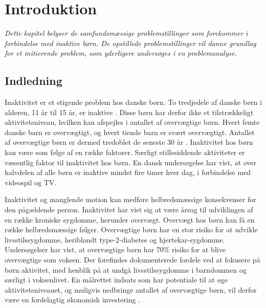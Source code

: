 \chapter{Introduktion}
\textit{Dette kapitel belyser de samfundsmæssige problemstillinger som forekommer i forbindelse med inaktive børn.
De opstillede problemstillinger vil danne grundlag for et initierende problem, som yderligere undersøges i en problemanalyse.}

\section{Indledning}
Inaktivitet er et stigende problem hos danske børn. To tredjedele af danske børn i alderen, 11 år til 15 år, er inaktive \citep{FAKTAARK_sundhedsstyrrelsen}. Disse børn har derfor ikke et tilstrækkeligt aktivitetsniveau, hvilken kan  afspejles i antallet af overvægtige børn. Hvert femte danske barn er overvægtigt, og hvert tiende barn er svært overvægtigt\citep{SKOLEBØRNSUNDERSØGELSEN}. Antallet af overvægtige børn er dermed tredoblet de seneste 30 år \citep{http://www.faktalink.dk/titelliste/overvaegtige-boern-og-unge}. \newline
Inaktivitet hos børn kan være som følge af en række faktorer. Særligt stillesiddende aktiviteter er væsentlig faktor til inaktivitet hos børn. En dansk undersøgelse har vist, at over halvdelen af alle børn er inaktive mindst fire timer hver dag, i forbindelse med videospil og TV\citep{SKOLEBØRNSUNDERSØGELSEN}.

Inaktivitet og manglende motion kan medføre helbredsmæssige konsekvenser for den pågældende person. Inaktivitet har vist sig at være årsag til udviklingen af en række kroniske sygdomme, herunder overvægt. \newline 
Overvægt hos børn kan få en række helbredsmæssige følger. Overvægtige børn har en stor risiko for at udvikle livsstilssygdomme, heriblandt type-2-diabetes og hjertekar-sygdomme. Undersøgelser har vist, at overvægtige børn har 70\% risiko for at blive overvægtige som voksen. \citep{http://www.ncbi.nlm.nih.gov/pubmed/16822919}
Der forefindes dokumenterede fordele ved at fokusere på børn aktivitet, med henblik på at undgå livsstilssygdomme i barndommen og særligt i voksenlivet. En målrettet indsats som har potentiale til at øge aktivitetsniveauet, og muligvis nedbringe antallet af overvægtige børn, vil derfor være en fordelagtig økonomisk investering \citep{http://www.abc-abc.dk/Om-ABC/OmAbc_Forside.aspx}.

